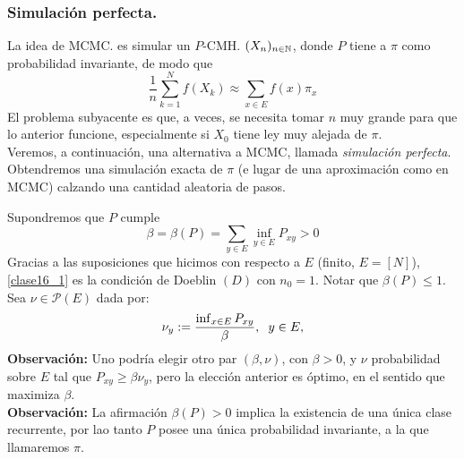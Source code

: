 \subsubsection{Simulación perfecta.}
La idea de MCMC. es simular  un $P$-CMH. $(X_n)_{n\in\mathbb N}$, donde  $P$ tiene a $\pi$ como probabilidad invariante, de modo que
\[\frac{1}{n}\sum_{k=1}^Nf(X_k) \approx \sum_{x\in E}f(x)\pi_x\]
El problema subyacente es que, a veces, se necesita tomar $n$ muy grande  para que lo anterior funcione, especialmente si $X_0$ tiene ley muy alejada de $\pi$.\\ \newline
Veremos, a continuación, una alternativa a MCMC, llamada \textit{simulación perfecta}. Obtendremos una simulación exacta de $\pi$ (e lugar de una aproximación como en MCMC) calzando una cantidad aleatoria de pasos.\\ \newline

Supondremos que $P$ cumple  
\begin{equation}
    \beta = \beta(P) = \sum_{y\in E}\inf_{y\in E}P_{xy} > 0
    \label{clase16_1}
\end{equation}
Gracias a las suposiciones que hicimos con respecto a $E$ (finito, $E=[N]$), \ref{clase16_1} es la condición de Doeblin $(D)$ con $n_0=1$. Notar que $\beta(P) \leq 1$.\\
Sea $\nu \in \mathcal{P}(E)$ dada por:
\[\nu_y := \frac{\inf_{x\in E}P_{xy}}{\beta},\hspace{0.2cm}y\in E,\]
\textbf{Observación: }Uno podría elegir otro par $(\beta,\nu)$, con $\beta >0$, y $\nu$ probabilidad sobre $E$ tal que $P_{xy}\geq \beta \nu_y$, pero la elección anterior es óptimo, en el sentido que maximiza $\beta$.\\ \newline
\textbf{Observación: }La afirmación $\beta(P)>0$ implica la existencia de una única clase recurrente, por lao tanto $P$ posee una única probabilidad invariante, a la que llamaremos $\pi$.\\ \newline

